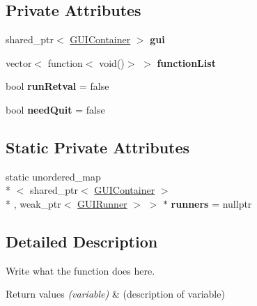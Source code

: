 \subsection*{Private Attributes}
\begin{DoxyCompactItemize}
\item 
\hypertarget{classGUIRunner_ad60838d742eaccba8a58b135f752621d}{shared\+\_\+ptr$<$ \hyperlink{classGUIContainer}{G\+U\+I\+Container} $>$ {\bfseries gui}}\label{classGUIRunner_ad60838d742eaccba8a58b135f752621d}

\item 
\hypertarget{classGUIRunner_a2cc56b998bbe4e30c760146648d7dee8}{vector$<$ function$<$ void()$>$ $>$ {\bfseries function\+List}}\label{classGUIRunner_a2cc56b998bbe4e30c760146648d7dee8}

\item 
\hypertarget{classGUIRunner_a19cbe217b41b144355edbcda2f482680}{bool {\bfseries run\+Retval} = false}\label{classGUIRunner_a19cbe217b41b144355edbcda2f482680}

\item 
\hypertarget{classGUIRunner_a2cec6973d0f9e098dbfdf1849b36b3f0}{bool {\bfseries need\+Quit} = false}\label{classGUIRunner_a2cec6973d0f9e098dbfdf1849b36b3f0}

\end{DoxyCompactItemize}
\subsection*{Static Private Attributes}
\begin{DoxyCompactItemize}
\item 
\hypertarget{classGUIRunner_adeced5f9556e581c711ffef78b992356}{static unordered\+\_\+map\\*
$<$ shared\+\_\+ptr$<$ \hyperlink{classGUIContainer}{G\+U\+I\+Container} $>$\\*
, weak\+\_\+ptr$<$ \hyperlink{classGUIRunner}{G\+U\+I\+Runner} $>$ $>$ $\ast$ {\bfseries runners} = nullptr}\label{classGUIRunner_adeced5f9556e581c711ffef78b992356}

\end{DoxyCompactItemize}


\subsection{Detailed Description}
Write what the function does here. 


\begin{DoxyRetVals}{Return values}
{\em (variable)} & (description of variable) \\
\hline
\end{DoxyRetVals}


